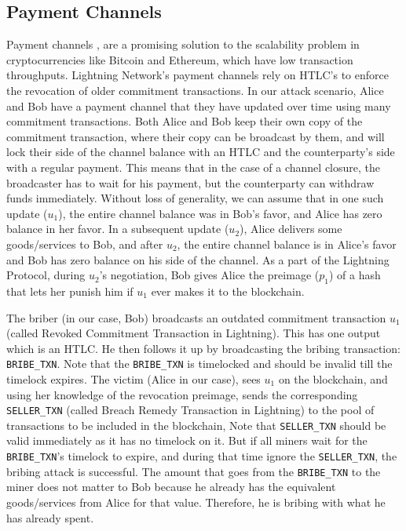 \documentclass[runningheads]{llncs}
\newcommand{\sellertxn}{\texttt{SELLER\_TXN}}
\newcommand{\bribetxn}{\texttt{BRIBE\_TXN}}
\begin{document}
\subsection{Payment Channels}
Payment channels \cite{decker_wattenhofer}, \cite{poon_dryja} are a promising solution to the scalability problem in cryptocurrencies like Bitcoin and Ethereum, which have low transaction throughputs. Lightning Network's \cite{poon_dryja} payment channels rely on HTLC's to enforce the revocation of older commitment transactions. In our attack scenario, Alice and Bob have a payment channel that they have updated over time using many commitment transactions. Both Alice and Bob keep their own copy of the commitment transaction, where their copy can be broadcast by them, and will lock their side of the channel balance with an HTLC and the counterparty's side with a regular payment. This means that in the case of a channel closure, the broadcaster has to wait for his payment, but the counterparty can withdraw funds immediately. Without loss of generality, we can assume that in one such update ($u_1$), the entire channel balance was in Bob's favor, and Alice has zero balance in her favor. In a subsequent update ($u_2$), Alice delivers some goods/services to Bob, and after $u_2$, the entire channel balance is in Alice's favor and Bob has zero balance on his side of the channel. As a part of the Lightning Protocol, during $u_2$'s negotiation, Bob gives Alice the preimage ($p_1$) of a hash that lets her punish him if $u_1$ ever makes it to the blockchain. 

The briber (in our case, Bob) broadcasts an outdated commitment transaction $u_1$ (called Revoked Commitment Transaction in Lightning). This has one output which is an HTLC. He then follows it up by broadcasting the bribing transaction: \bribetxn. Note that the \bribetxn{} is timelocked and should be invalid till the timelock expires. The victim (Alice in our case), sees $u_1$ on the blockchain, and using her knowledge of the revocation preimage, sends the corresponding \sellertxn{} (called Breach Remedy Transaction in Lightning) to the pool of transactions to be included in the blockchain, Note that \sellertxn{} should be valid immediately as it has no timelock on it. But if all miners wait for the \bribetxn{}'s timelock to expire, and during that time ignore the \sellertxn{}, the bribing attack is successful. The amount that goes from the \bribetxn{} to the miner does not matter to Bob because he already has the equivalent goods/services from Alice for that value. Therefore, he is bribing with what he has already spent.
\end{document}
